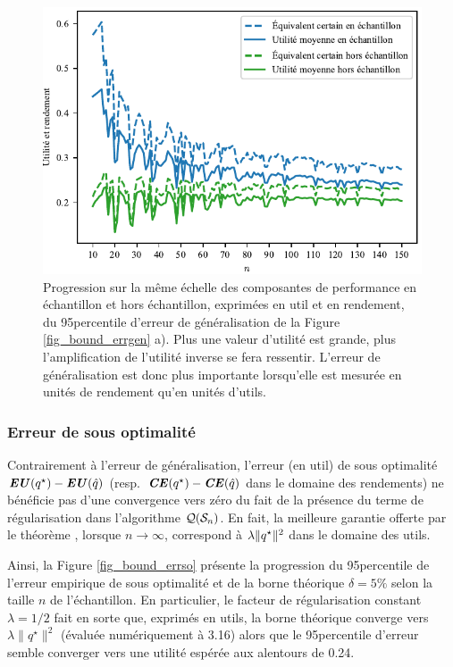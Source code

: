 \begin{figure}[h!]
  \centering
  \includegraphics[width=\textwidth]{../experiments/fig/bound_gencomps.pdf}
  \caption[Composantes de l'erreur maximale]{Progression sur la même échelle des
    composantes de performance en échantillon et hors échantillon, exprimées en util et en
    rendement, du 95\ieme percentile d'erreur de généralisation de la Figure
    \ref{fig_bound_errgen} a). Plus une valeur d'utilité est grande, plus l'amplification
    de l'utilité inverse se fera ressentir. L'erreur de généralisation est donc plus
    importante lorsqu'elle est mesurée en unités de rendement qu'en unités d'utils.  }
  \label{fig_bound_gencomps}
\end{figure}

\clearpage


\subsubsection{Erreur de sous optimalité}

Contrairement à l'erreur de généralisation, l'erreur (en util) de sous optimalité
$\operatorname{\mbox{\textbf{\textit{EU}}}}(q^\star) - \operatorname{\mbox{\textbf{\textit{EU}}}}(\hat q)$ (resp.~$\operatorname{\mbox{\textbf{\textit{CE}}}}(q^\star) - \operatorname{\mbox{\textbf{\textit{CE}}}}(\hat q)$ dans le domaine des rendements) ne
bénéficie pas d'une convergence vers zéro du fait de la présence du terme de
régularisation dans l'algorithme $\mathcal{Q}(\mathcal S_n)$. En fait, la meilleure garantie offerte par
le théorème \cit, lorsque $n\to\infty$, correspond à $\lambda\|q^\star\|^2$ dans le domaine des utils.

Ainsi, la Figure \ref{fig_bound_errso} présente la progression du 95\ieme percentile de
l'erreur empirique de sous optimalité et de la borne théorique $\delta = 5\%$ selon la taille
$n$ de l'échantillon. En particulier, le facteur de régularisation constant
$\lambda = 1/2$ fait en sorte que, exprimés en utils, la borne théorique converge vers
$\lambda\|q^\star\|^2$ (évaluée numériquement à \num{3.16}) alors que le 95\ieme percentile d'erreur
semble converger vers une utilité espérée aux alentours de \num{0.24}.

